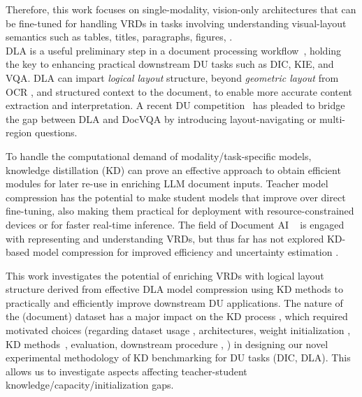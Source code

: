 \documentclass[runningheads]{llncs}
\begin{document}
Therefore, this work focuses on single-modality, vision-only architectures that can be fine-tuned for handling VRDs in tasks involving understanding visual-layout semantics such as tables, titles, paragraphs, figures, \etc. \\
DLA is a useful preliminary step in a document processing workflow~\cite{binmakhashen2019document, da2023vision}, holding the key to enhancing practical downstream DU tasks such as DIC, KIE, and VQA. DLA can impart \textit{logical layout} structure, beyond \textit{geometric layout} from OCR \cite{haralick1994document}, and structured context to the document, to enable more accurate content extraction and interpretation. A recent DU competition~\cite{VanLandeghem2023icdar} has pleaded to bridge the gap between DLA and DocVQA by introducing layout-navigating or multi-region questions.

To handle the computational demand of modality/task-specific models, knowledge distillation (KD) \cite{ba2014deep,hinton2015distilling,romero2014fitnets,gou2021knowledge} can prove an effective approach to obtain efficient modules for later re-use in enriching LLM document inputs. Teacher model compression has the potential to make student models that improve over direct fine-tuning, also making them practical for deployment with resource-constrained devices or for faster real-time inference.
The field of Document AI ~\cite{cui2021document} is engaged with representing and understanding VRDs, but thus far has not explored KD-based model compression for improved efficiency and uncertainty estimation \cite{galil2023can}.

This work investigates the potential of enriching VRDs with logical layout structure derived from effective DLA model compression using KD methods to practically and efficiently improve downstream DU applications.
The nature of the (document) dataset has a major impact on the KD process \cite{stanton2021does}, which required motivated choices (regarding dataset usage \cite{pfitzmann2022doclaynet,
    antonacopoulos2009realistic,
    harley2015evaluation}, architectures, weight initialization \cite{li2022dit}, KD methods~\cite{SimKD, he2021distilling, chen2021distilling, zhang2020distilling, hsieh2023distilling,hinton2015distilling}, evaluation, downstream procedure \cite{wang2023layout}, \etc) in designing our novel experimental methodology of KD benchmarking for DU tasks (DIC, DLA). This allows us to investigate aspects affecting teacher-student knowledge/capacity/initialization gaps.
\end{document}
